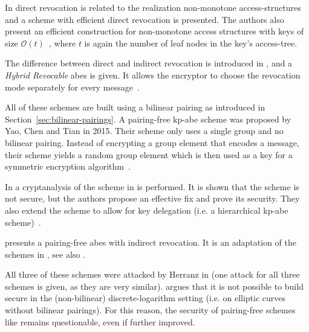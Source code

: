 In \cite{lewko_revocation_2008} direct revocation is related to the realization non-monotone \glspl{access-structure} and a scheme with efficient direct revocation is presented.
The authors also present an efficient construction for non-monotone access structures with keys of size $\mathcal{O}(t)$~\cite{lewko_revocation_2008}, where $t$ is again the number of leaf nodes in the key's \gls{access-tree}.

The difference between direct and indirect revocation is introduced in \cite{attrapadung_attribute-based_2009}, and a \emph{Hybrid Revocable} \acrshort{abes} is given.
It allows the encryptor to choose the revocation mode separately for every message~\cite{attrapadung_attribute-based_2009}.

All of these schemes are built using a bilinear pairing as introduced in Section~\ref{sec:bilinear-pairings}.
A pairing-free \acrshort{kp-abe} scheme was proposed by Yao, Chen and Tian \cite{yao_lightweight_2015} in 2015.
Their scheme only uses a single group and no bilinear pairing.
Instead of encrypting a group element that encodes a message, their scheme yields a random group element which is then used as a key for a symmetric encryption algorithm~\cite{yao_lightweight_2015}.

In \cite{tan_enhancement_2019} a cryptanalysis of the scheme in \cite{yao_lightweight_2015} is performed.
It is shown that the scheme is not secure, but the authors propose an effective fix and prove its security.
They also extend the scheme to allow for key delegation (i.e. a hierarchical \acrshort{kp-abe} scheme)~\cite{tan_enhancement_2019}.

\cite{sowjanya_efficient_2020} presents a pairing-free \acrshort{abes} with indirect revocation.
It is an adaptation of the schemes in \cite{yao_lightweight_2015,tan_enhancement_2019}, see also \cite{herranz_attacking_2020}.

All three of these schemes were attacked by Herranz in \cite{herranz_attacking_2020} (one attack for all three schemes is given, as they are very similar).
\cite{herranz_attacking_2020} argues that it is not possible to build secure  in the (non-bilinear) discrete-logarithm setting (i.e. on elliptic curves without bilinear pairings).
For this reason, the security of pairing-free schemes like \cite{yao_lightweight_2015,sowjanya_efficient_2020,tan_enhancement_2019} remains questionable, even if further improved.

